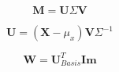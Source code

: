 \documentclass{article}
\begin{document}
\begin{equation}
    \textbf{M} = \textbf{U} \textbf{$\Sigma$} \textbf{V}
\end{equation}

\begin{equation}
    \textbf{U} = (\textbf{X} - \mu_{x}) \textbf{V} \Sigma^{-1}
\end{equation}

\begin{equation}
    \textbf{W} = \textbf{U}_{Basis}^{T} \textbf{Im}
\end{equation}




\end{document}
